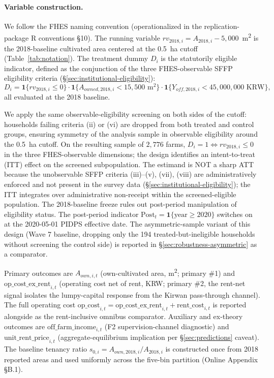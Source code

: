 \documentclass[12pt, a4paper]{article}
\begin{document}
\paragraph{Variable construction.} We follow the FHES naming convention (operationalized in the replication-package R conventions §10). The running variable $rv_{2018,i} = A_{2018,i} - 5{,}000$~m\textsuperscript{2} is the 2018-baseline cultivated area centered at the 0.5~ha cutoff (Table~\ref{tab:notation}). The treatment dummy $D_i$ is the statutorily eligible indicator, defined as the conjunction of the three FHES-observable SFFP eligibility criteria (\S\ref{sec:institutional-eligibility}):
\begin{equation}\label{eq:Di-def}
D_i = \mathbf{1}\{rv_{2018,i} \le 0\} \cdot \mathbf{1}\{A_{owned,2018,i} < 15{,}500 \text{ m}^2\} \cdot \mathbf{1}\{Y_{off,2018,i} < 45{,}000{,}000 \text{ KRW}\},
\end{equation}
all evaluated at the 2018 baseline.

We apply the same observable-eligibility screening on both sides of the cutoff: households failing criteria (ii) or (vi) are dropped from both treated and control groups, ensuring symmetry of the analysis sample in observable eligibility around the 0.5~ha cutoff. On the resulting sample of $2{,}776$ farms, $D_i = 1 \iff rv_{2018,i} \le 0$ in the three FHES-observable dimensions; the design identifies an intent-to-treat (ITT) effect on the screened subpopulation. The estimand is NOT a sharp ATT because the unobservable SFFP criteria (iii)--(v), (vii), (viii) are administratively enforced and not present in the survey data (\S\ref{sec:institutional-eligibility}); the ITT integrates over administrative non-receipt within the screened-eligible population. The 2018-baseline freeze rules out post-period manipulation of eligibility status. The post-period indicator $\text{Post}_t = \mathbf{1}\{\text{year} \ge 2020\}$ switches on at the 2020-05-01 PIDPS effective date. The asymmetric-sample variant of this design (Wave 7 baseline, dropping only the 194 treated-but-ineligible households without screening the control side) is reported in \S\ref{sec:robustness-asymmetric} as a comparator.

Primary outcomes are $A_{own,i,t}$ (own-cultivated area, m\textsuperscript{2}; primary \#1) and $\text{op\_cost\_ex\_rent}_{i,t}$ (operating cost net of rent, KRW; primary \#2, the rent-net signal isolates the lumpy-capital response from the Kirwan pass-through channel). The full operating cost $\text{op\_cost}_{i,t} = \text{op\_cost\_ex\_rent}_{i,t} + \text{rent\_cost}_{i,t}$ is reported alongside as the rent-inclusive omnibus comparator. Auxiliary and ex-theory outcomes are $\text{off\_farm\_income}_{i,t}$ (F2 supervision-channel diagnostic) and $\text{unit\_rent\_price}_{i,t}$ (aggregate-equilibrium implication per \S\ref{sec:predictions} caveat). The baseline tenancy ratio $s_{0,i} = A_{own,2018,i}/A_{2018,i}$ is constructed once from 2018 reported areas and used uniformly across the five-bin partition (Online Appendix \S B.1).
\end{document}
